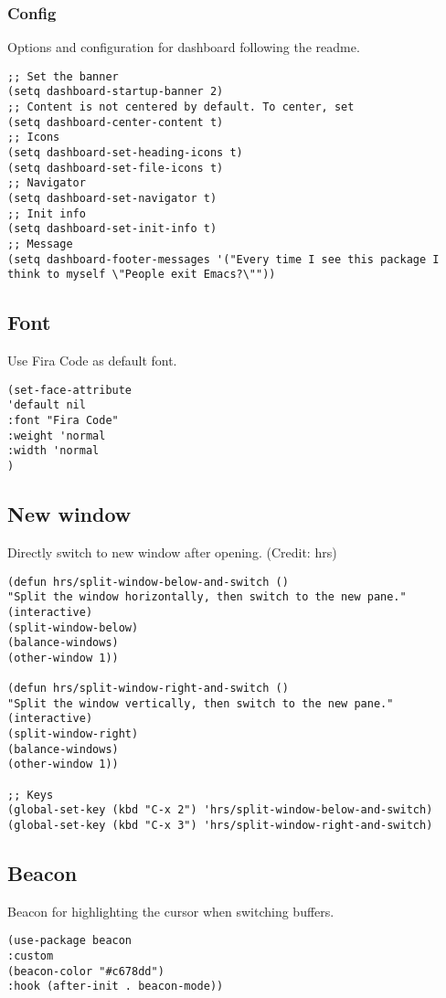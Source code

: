 \documentclass[11pt]{article}
\begin{document}
\subsubsection*{Config}
\label{sec:org2f2dfb5}
Options and configuration for dashboard following the readme.
\begin{verbatim}
;; Set the banner
(setq dashboard-startup-banner 2)
;; Content is not centered by default. To center, set
(setq dashboard-center-content t)
;; Icons
(setq dashboard-set-heading-icons t)
(setq dashboard-set-file-icons t)
;; Navigator
(setq dashboard-set-navigator t)
;; Init info
(setq dashboard-set-init-info t)
;; Message
(setq dashboard-footer-messages '("Every time I see this package I think to myself \"People exit Emacs?\""))
\end{verbatim}
\subsection*{Font}
\label{sec:org9bb52fb}
Use Fira Code as default font.
\begin{verbatim}
(set-face-attribute
'default nil
:font "Fira Code"
:weight 'normal
:width 'normal
)
\end{verbatim}
\subsection*{New window}
\label{sec:org2b6c3e3}
Directly switch to new window after opening.
(Credit: hrs)
\begin{verbatim}
(defun hrs/split-window-below-and-switch ()
"Split the window horizontally, then switch to the new pane."
(interactive)
(split-window-below)
(balance-windows)
(other-window 1))

(defun hrs/split-window-right-and-switch ()
"Split the window vertically, then switch to the new pane."
(interactive)
(split-window-right)
(balance-windows)
(other-window 1))

;; Keys
(global-set-key (kbd "C-x 2") 'hrs/split-window-below-and-switch)
(global-set-key (kbd "C-x 3") 'hrs/split-window-right-and-switch)
\end{verbatim}
\subsection*{Beacon}
\label{sec:orgc2ccd30}
Beacon for highlighting the cursor when switching buffers.
\begin{verbatim}
(use-package beacon
:custom
(beacon-color "#c678dd")
:hook (after-init . beacon-mode))
\end{verbatim}
\end{document}

